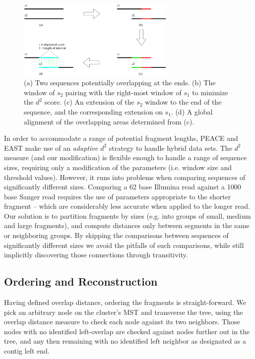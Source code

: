 \documentclass{bioinfo}
\newcommand{\peace} {{\small PEACE}}
\newcommand{\east} {{\small EAST}}
\begin{document}
\begin{figure}
\centerline{\includegraphics[width=3in]{pics.d/overlap_alignment.pdf}}
\caption{(a) Two sequences potentially overlapping at the ends.  (b)
  The window of $s_2$ pairing with the right-most window of $s_1$ to
  minimize the $d^2$ score.  (c) An extension of the $s_2$ window to
  the end of the sequence, and the corresponding extension on $s_1$.
  (d) A global alignment of the overlapping areas determined from
  (c).}\label{fig:overlap}
\end{figure}


In order to accommodate a range of potential fragment lengths, \peace\/
and \east\/ make use of an {\it adaptive $d^2$} strategy to handle
hybrid data sets.  The $d^2$ measure (and our modification) is
flexible enough to handle a range of sequence sizes, requiring only a
modification of the parameters (i.e. window size and threshold
values).  However, it runs into problems when comparing sequences of
significantly different sizes.  Comparing a 62 base Illumina read
against a 1000 base Sanger read requires the use of parameters
appropriate to the shorter fragment -- which are considerably less
accurate when applied to the longer read.  Our solution is to
partition fragments by sizes (e.g. into groups of small, medium and
large fragments), and compute distances only between segments in the
same or neighboring groups.  By skipping the comparisons between
sequences of significantly different sizes we avoid the pitfalls of
such comparisons, while still implicitly discovering those connections
through transitivity.

\subsection*{Ordering and Reconstruction}

Having defined overlap distance, ordering the fragments is
straight-forward.  We pick an arbitrary node on the cluster's MST and
transverse the tree, using the overlap distance measure to check each
node against its two neighbors.  Those nodes with no identified
left-overlap are checked against nodes further out in the tree, and
any then remaining with no identified left neighbor as designated as a contig
left end.
\end{document}
